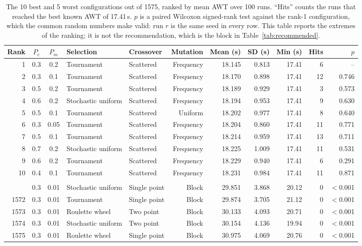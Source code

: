 \begin{table}[t]
\centering
\small
\caption{The 10 best and 5 worst configurations out of 1575, ranked by
mean AWT over 100 runs. ``Hits'' counts the runs that reached the best
known AWT of 17.41\,s. $p$ is a paired Wilcoxon signed-rank test against
the rank-1 configuration, which the common random numbers make valid:
run $r$ is the same seed in every row. This table reports the extremes
of the ranking; it is not the recommendation, which is the block in
Table~\ref{tab:recommended}.}
\label{tab:best-worst}
\begin{tabular}{rccllrrrrrr}
\toprule
Rank & $P_c$ & $P_m$ & Selection & Crossover & Mutation & Mean (s) & SD (s) & Min (s) & Hits & $p$\\
\midrule
1 & 0.3 & 0.2 & Tournament & Scattered & Frequency & 18.145 & 0.813 & 17.41 & 6 & --\\
2 & 0.3 & 0.1 & Tournament & Scattered & Frequency & 18.170 & 0.898 & 17.41 & 12 & 0.746\\
3 & 0.5 & 0.2 & Tournament & Scattered & Frequency & 18.189 & 0.929 & 17.41 & 3 & 0.573\\
4 & 0.6 & 0.2 & Stochastic uniform & Scattered & Frequency & 18.194 & 0.953 & 17.41 & 9 & 0.630\\
5 & 0.5 & 0.1 & Tournament & Scattered & Uniform & 18.202 & 0.977 & 17.41 & 8 & 0.640\\
6 & 0.3 & 0.05 & Tournament & Scattered & Frequency & 18.204 & 0.860 & 17.41 & 11 & 0.771\\
7 & 0.5 & 0.1 & Tournament & Scattered & Frequency & 18.214 & 0.959 & 17.41 & 13 & 0.711\\
8 & 0.7 & 0.2 & Stochastic uniform & Scattered & Frequency & 18.225 & 1.009 & 17.41 & 11 & 0.531\\
9 & 0.6 & 0.2 & Tournament & Scattered & Frequency & 18.229 & 0.940 & 17.41 & 6 & 0.291\\
10 & 0.4 & 0.1 & Tournament & Scattered & Frequency & 18.231 & 0.984 & 17.41 & 11 & 0.871\\
\addlinespace
\multicolumn{11}{c}{$\vdots$}\\
\addlinespace
1571 & 0.3 & 0.01 & Stochastic uniform & Single point & Block & 29.851 & 3.868 & 20.12 & 0 & $<$0.001\\
1572 & 0.3 & 0.01 & Tournament & Single point & Block & 29.874 & 3.705 & 21.12 & 0 & $<$0.001\\
1573 & 0.3 & 0.01 & Roulette wheel & Two point & Block & 30.133 & 4.093 & 20.71 & 0 & $<$0.001\\
1574 & 0.3 & 0.01 & Stochastic uniform & Two point & Block & 30.154 & 4.136 & 19.94 & 0 & $<$0.001\\
1575 & 0.3 & 0.01 & Roulette wheel & Single point & Block & 30.975 & 4.069 & 20.76 & 0 & $<$0.001\\
\bottomrule
\end{tabular}
\end{table}
